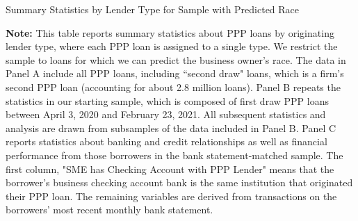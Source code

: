 \documentclass[11pt]{article}
\begin{document}
\newpage
\begin{table}[H]
	\caption{Summary Statistics by Lender Type for Sample with Predicted Race} \label{t_stats_loan_app}
	
	\begin{adjustbox}{width=\linewidth, center}
		
	\end{adjustbox}

	\begin{adjustbox}{width=\linewidth, center}
		
	\end{adjustbox}

	\begin{minipage}{\textwidth} \medskip
		\footnotesize{{\bf Note: }This table reports summary statistics about PPP loans by originating lender type, where each PPP loan is assigned to a single type. We restrict the sample to loans for which we can predict the business owner's race. The data in Panel A include all PPP loans, including ``second draw" loans, which is a firm's second PPP loan (accounting for about 2.8 million loans). Panel B repeats the statistics in our starting sample, which is composed of first draw PPP loans between April 3, 2020 and February 23, 2021. All subsequent statistics and analysis are drawn from subsamples of the data included in Panel B. Panel C reports statistics about banking and credit relationships as well as financial performance from those borrowers in the bank statement-matched sample. The first column, "SME has Checking Account with PPP Lender" means that the borrower's business checking account bank is the same institution that originated their PPP loan. The remaining variables are derived from transactions on the borrowers' most recent monthly bank statement. }
	\end{minipage}
\end{table}
\end{document}
